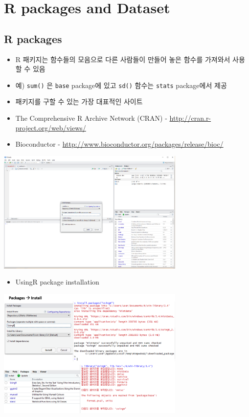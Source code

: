 \documentclass[
]{book}
\providecommand{\tightlist}{%
  \setlength{\itemsep}{0pt}\setlength{\parskip}{0pt}}
\begin{document}
\hypertarget{r-packages-and-dataset}{%
\section{R packages and Dataset}\label{r-packages-and-dataset}}

\hypertarget{r-packages}{%
\subsection{R packages}\label{r-packages}}

\begin{itemize}
\tightlist
\item
  R 패키지는 함수들의 모음으로 다른 사람들이 만들어 놓은 함수를 가져와서 사용할 수 있음
\item
  예) \texttt{sum()} 은 \texttt{base} package에 있고 \texttt{sd()} 함수는 \texttt{stats} package에서 제공
\item
  패키지를 구할 수 있는 가장 대표적인 사이트
\item
  The Comprehensive R Archive Network (CRAN) - \url{http://cran.r-project.org/web/views/}
\item
  Bioconductor - \url{http://www.bioconductor.org/packages/release/bioc/}
\end{itemize}

\includegraphics[width=3.64583in,height=\textheight]{images/01/01-18.png}

\begin{itemize}
\tightlist
\item
  UsingR package installation
\end{itemize}

\includegraphics[width=3.64583in,height=\textheight]{images/01/01-19.png}
\end{document}
